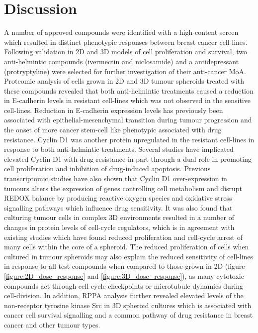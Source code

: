 \documentclass[a4paper,11pt,twoside,openright]{scrbook}
\begin{document}
\section{Discussion}

A number of approved compounds were identified with a high-content screen which resulted in distinct phenotypic 
responses between breast cancer cell-lines.
Following validation in 2D and 3D models of cell proliferation and survival, two anti-helmintic compounds (ivermectin 
and niclosamide) and a antidepressant (protryptyline) were selected for further investigation of their anti-cancer MoA.
Proteomic analysis of cells grown in 2D and 3D tumour spheroids treated with these compounds revealed that both 
anti-helmintic treatments caused a reduction in E-cadherin levels in resistant cell-lines which was not observed in the 
sensitive cell-lines.
Reduction in E-cadherin expression levels has previously been associated with epithelial-mesenchymal transition during 
tumour progression and the onset of more cancer stem-cell like phenotypic associated with drug resistance. 
\cite{Izumiya2012,Farmakovskaya2016}
Cyclin D1 was another protein upregulated in the resistant cell-lines in response to both anti-helmintic treatments.
Several studies have implicated elevated Cyclin D1 with drug resistance in part through a dual role in promoting cell 
proliferation and inhibition of drug-induced apoptosis. \cite{Biliran2005}
Previous transcriptomic studies have also shown that Cyclin D1 over-expression in tumours alters the expression of 
genes controlling cell metabolism and disrupt REDOX balance by producing reactive oxygen species and oxidative stress 
signalling pathways which influence drug sensitivity. \cite{Bustany2016}
It was also found that culturing tumour cells in complex 3D environments resulted in a number of changes in protein 
levels of cell-cycle regulators, which is in agreement with existing studies which have found reduced proliferation and 
cell-cycle arrest of many cells within the core of a spheroid.\cite{Laurent2013a}
The reduced proliferation of cells when cultured in tumour spheroids may also explain the reduced sensitivity of 
cell-lines in response to all test compounds when compared to those grown in 2D (figure \ref{figure:2D_dose_response} 
and \ref{figure:3D_dose_response}), as many cytotoxic compounds act through cell-cycle checkpoints or microtubule 
dynamics during cell-division.
In addition, RPPA analysis further revealed elevated levels of the non-receptor tyrosine kinase Src in 3D spheroid 
cultures which is associated with cancer cell survival signalling and a common pathway of drug resistance in breast 
cancer and other tumour types. \cite{Zhang2011a}
\end{document}
